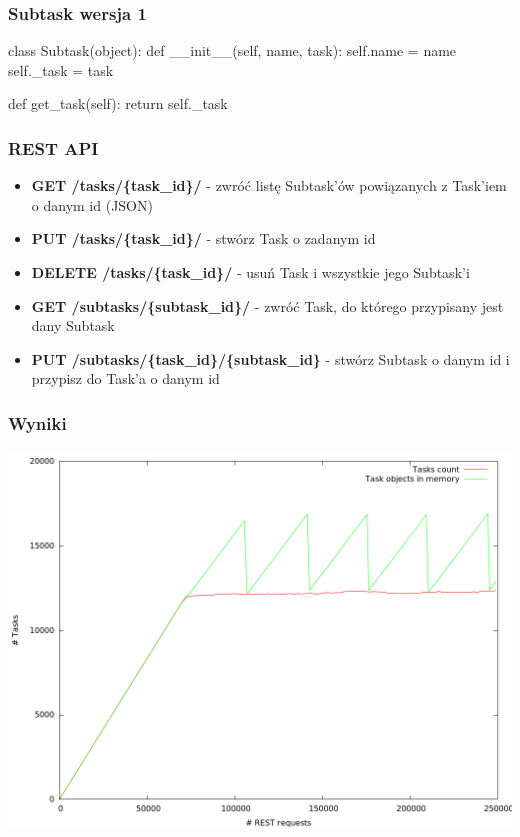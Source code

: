 \documentclass{beamer}
\begin{document}
    \begin{frame}[fragile]
        \frametitle{Subtask wersja 1}
        \begin{semiverbatim}
class Subtask(object):
    def __init__(self, name, task):
        self.name = name
        self._task = task

    def get_task(self):
        return self._task
        \end{semiverbatim}
\end{frame}

    \begin{frame}
        \frametitle{REST API}
        \begin{itemize}
            \item \textbf{GET /tasks/\{task\_id\}/} - zwróć listę Subtask'ów powiązanych z Task'iem o danym id (JSON)
            \item \textbf{PUT /tasks/\{task\_id\}/} - stwórz Task o zadanym id
            \item \textbf{DELETE /tasks/\{task\_id\}/} - usuń Task i wszystkie jego Subtask'i
            \item \textbf{GET /subtasks/\{subtask\_id\}/} - zwróć Task, do którego przypisany jest dany Subtask
            \item \textbf{PUT /subtasks/\{task\_id\}/\{subtask\_id\}} - stwórz Subtask o danym id i przypisz do Task'a o danym id
        \end{itemize}
    \end{frame}

    \begin{frame}
        \frametitle{Wyniki}
        \includegraphics[height=0.8\textheight]{gc_tasks.png}
    \end{frame}
\end{document}
